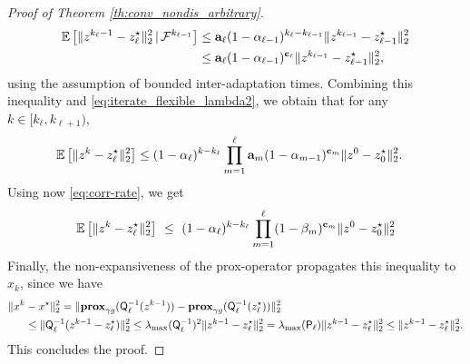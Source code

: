 \begin{proof}[Proof of Theorem \ref{th:conv_nondis_arbitrary}]
\begin{align}
  \nonumber  \mathbb{E}\left[\|z^{k_\ell-1}-z^{\star}_{\ell}\|_2^2\,|\,\mathcal{F}^{k_{\ell-1}}\right] &\leq  \mathbf{a}_\ell  (1-\alpha_{\ell-1})^{k_{\ell}-k_{\ell-1}} \|z^{k_{\ell-1}}-z^{\star}_{\ell-1}\|_2^2 \\
   &\leq  \mathbf{a}_\ell  (1-\alpha_{\ell-1})^{\mathbf{c}_\ell} \|z^{k_{\ell-1}}-z^{\star}_{\ell-1}\|_2^2,
\end{align} 
using the assumption of bounded inter-adaptation times.
Combining this inequality and \eqref{eq:iterate_flexible_lambda2}, we obtain that for any $k\in[k_\ell,k_{\ell+1})$, 
\begin{align*}
    \mathbb{E}\left[\|z^{k}-z^{\star}_{\ell}\|_2^2\right] &\leq (1-\alpha_\ell)^{k-k_\ell}
    \prod_{m=1}^\ell  \mathbf{a}_m (1-\alpha_{m-1})^{\mathbf{c}_m} \|z^{0}-z^{\star}_{0}\|_2^2.
    \end{align*}
Using now \eqref{eq:corr-rate}, we get    
\[
\mathbb{E}\left[\|z^{k}-z^{\star}_{\ell}\|_2^2\right] ~\leq~ (1-\alpha_\ell)^{k-k_\ell}
    \prod_{m=1}^\ell  (1-\beta_{m})^{\mathbf{c}_m} \|z^{0}-z^{\star}_{0}\|_2^2
\]
Finally, the non-expansiveness of the prox-operator propagates this inequality to $x_k$, since we have 
\begin{align*}
\|x^k &- x^\star\|_2^2 = \|\prox_{\gamma g}(\bQ_\ell^{-1}(z^{k-1})) - \prox_{\gamma g}(\bQ_\ell^{-1}(z_\ell^\star))\|_2^2\\
&\leq
\|\bQ_\ell^{-1}(z^{k-1} - z_\ell^\star)\|_2^2 \leq \lambda_{\max}(\bQ_\ell^{-1})^2  \|z^{k-1}-z^\star_\ell\|_2^2 =  %
\lambda_{\max}(\bP_\ell)  \|z^{k-1}-z^\star_\ell\|_2^2 \leq \|z^{k-1}-z^\star_\ell\|_2^2.
\end{align*}
This concludes the proof.
\end{proof}


